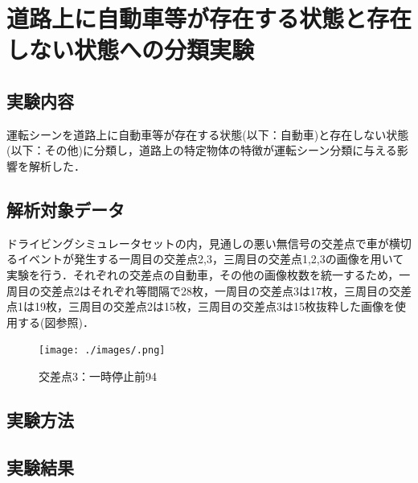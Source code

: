 \newpage

\section{道路上に自動車等が存在する状態と存在しない状態への分類実験}

\subsection{実験内容}
運転シーンを道路上に自動車等が存在する状態(以下：自動車)と存在しない状態(以下：その他)に分類し，道路上の特定物体の特徴が運転シーン分類に与える影響を解析した．\\

\subsection{解析対象データ}
ドライビングシミュレータセットの内，見通しの悪い無信号の交差点で車が横切るイベントが発生する一周目の交差点2,3，三周目の交差点1,2,3の画像を用いて実験を行う．それぞれの交差点の自動車，その他の画像枚数を統一するため，一周目の交差点2はそれぞれ等間隔で28枚，一周目の交差点3は17枚，三周目の交差点1は19枚，三周目の交差点2は15枚，三周目の交差点3は15枚抜粋した画像を使用する(図参照)．\\

\begin{figure}[htbp]
  \begin{center}
    \texttt{[image: ./images/.png]}
    \caption{交差点3：一時停止前94}
    \label{fig:ds3stop94}
  \end{center}
\end{figure}


\subsection{実験方法}

\subsection{実験結果}


